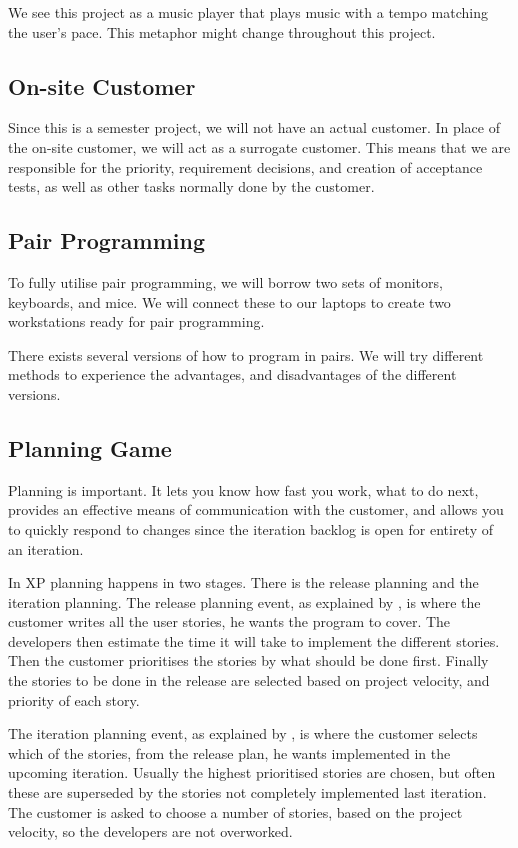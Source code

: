 We see this project as a music player that plays music with a tempo matching the user's pace.
This metaphor might change throughout this project.

\subsection{On-site Customer}
Since this is a semester project, we will not have an actual customer.
In place of the on-site customer, we will act as a surrogate customer.
This means that we are responsible for the priority, requirement decisions, and creation of acceptance tests, as well as other tasks normally done by the customer.

\subsection{Pair Programming}
To fully utilise pair programming, we will borrow two sets of monitors, keyboards, and mice.
We will connect these to our laptops to create two workstations ready for pair programming.

There exists several versions of how to program in pairs. We will try different methods to experience the advantages, and disadvantages of the different versions.

\subsection{Planning Game}
Planning is important. It lets you know how fast you work, what to do next, provides an effective means of communication with the customer, and allows you to quickly respond to changes since the iteration backlog is open for entirety of an iteration.

In XP planning happens in two stages. There is the release planning and the iteration planning.
The release planning event, as explained by \citet[p. 40]{xp:planning}, is where the customer writes all the user stories, he wants the program to cover.
The developers then estimate the time it will take to implement the different stories.
Then the customer prioritises the stories by what should be done first.
Finally the stories to be done in the release are selected based on project velocity, and priority of each story.

The iteration planning event, as explained by \citet[Iteration Planning]{xp:online}, is where the customer selects which of the stories, from the release plan, he wants implemented in the upcoming iteration.
Usually the highest prioritised stories are chosen, but often these are superseded by the stories not completely implemented last iteration.
The customer is asked to choose a number of stories, based on the project velocity, so the developers are not overworked.

